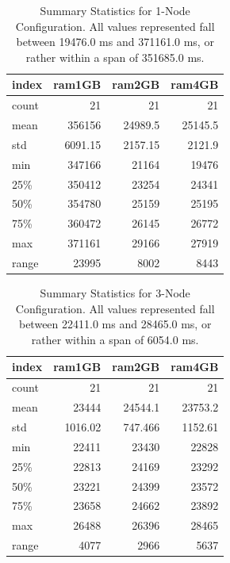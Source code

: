 \begin{table}
\begin{tabular}{lrrr}
\toprule
 index &  ram1GB &  ram2GB &  ram4GB \\
\midrule
 count &      21 &      21 &      21 \\
  mean &  356156 & 24989.5 & 25145.5 \\
   std & 6091.15 & 2157.15 &  2121.9 \\
   min &  347166 &   21164 &   19476 \\
   25\% &  350412 &   23254 &   24341 \\
   50\% &  354780 &   25159 &   25195 \\
   75\% &  360472 &   26145 &   26772 \\
   max &  371161 &   29166 &   27919 \\
 range &   23995 &    8002 &    8443 \\
\bottomrule
\end{tabular}
\caption{Summary Statistics for 1-Node Configuration. All values represented fall between 19476.0 ms and 371161.0 ms, or rather within a span of 351685.0 ms.}
\label{table:summary_statistics_for_1_config}
\end{table}
\begin{table}
\begin{tabular}{lrrr}
\toprule
 index &  ram1GB &  ram2GB &  ram4GB \\
\midrule
 count &      21 &      21 &      21 \\
  mean &   23444 & 24544.1 & 23753.2 \\
   std & 1016.02 & 747.466 & 1152.61 \\
   min &   22411 &   23430 &   22828 \\
   25\% &   22813 &   24169 &   23292 \\
   50\% &   23221 &   24399 &   23572 \\
   75\% &   23658 &   24662 &   23892 \\
   max &   26488 &   26396 &   28465 \\
 range &    4077 &    2966 &    5637 \\
\bottomrule
\end{tabular}
\caption{Summary Statistics for 3-Node Configuration. All values represented fall between 22411.0 ms and 28465.0 ms, or rather within a span of 6054.0 ms.}
\label{table:summary_statistics_for_3_config}
\end{table}
